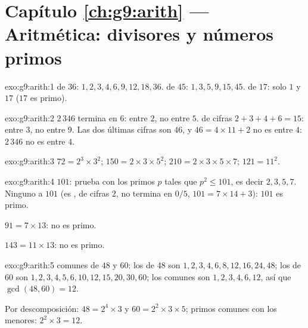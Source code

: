 \section*{Capítulo \ref{ch:g9:arith} --- Aritmética: divisores y números primos}

\begin{solution}{exo:g9:arith:1}
 de $36$: $1, 2, 3, 4, 6, 9, 12, 18, 36$.
 de $45$: $1, 3, 5, 9, 15, 45$.
 de $17$: solo $1$ y $17$ ($17$ es primo).
\end{solution}

\begin{solution}{exo:g9:arith:2}
$2\,346$ termina en $6$:  entre $2$, no entre $5$.  de cifras
$2 + 3 + 4 + 6 = 15$:  entre $3$, no entre $9$. Las dos últimas cifras son
$46$, y $46 = 4 \times 11 + 2$ no es  entre $4$: $2\,346$ no es
 entre $4$.
\end{solution}

\begin{solution}{exo:g9:arith:3}
$72 = 2^3 \times 3^2$; \quad
$150 = 2 \times 3 \times 5^2$; \quad
$210 = 2 \times 3 \times 5 \times 7$; \quad
$121 = 11^2$.
\end{solution}

\begin{solution}{exo:g9:arith:4}
$101$: prueba con los primos $p$ tales que $p^2 \leq 101$, es decir $2, 3, 5, 7$. Ninguno
 a $101$ (es ,  de cifras $2$, no termina en $0/5$,
$101 = 7 \times 14 + 3$): $101$ es primo.

$91 = 7 \times 13$: no es primo.

$143 = 11 \times 13$: no es primo.
\end{solution}

\begin{solution}{exo:g9:arith:5}
 comunes de $48$ y $60$: los  de 48 son $1, 2, 3, 4, 6, 8,
12, 16, 24, 48$; los  de $60$ son $1, 2, 3, 4, 5, 6, 10, 12, 15, 20,
30, 60$; los comunes son $1, 2, 3, 4, 6, 12$, así que $\gcd(48,60) = 12$.

Por descomposición: $48 = 2^4 \times 3$ y $60 = 2^2 \times 3 \times 5$;
primos comunes con los  menores: $2^2 \times 3 = 12$.
\end{solution}

